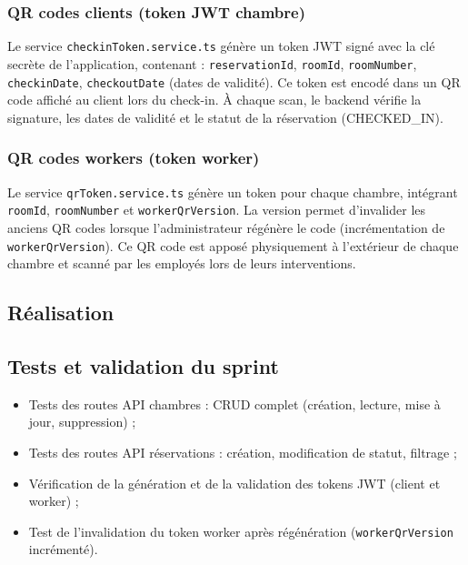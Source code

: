 \subsubsection{QR codes clients (token JWT chambre)}

Le service \texttt{checkinToken.service.ts} génère un token JWT signé avec la clé secrète de l'application, contenant : \texttt{reservationId}, \texttt{roomId}, \texttt{roomNumber}, \texttt{checkinDate}, \texttt{checkoutDate} (dates de validité). Ce token est encodé dans un QR code affiché au client lors du check-in. À chaque scan, le backend vérifie la signature, les dates de validité et le statut de la réservation (CHECKED\_IN).

\subsubsection{QR codes workers (token worker)}

Le service \texttt{qrToken.service.ts} génère un token pour chaque chambre, intégrant \texttt{roomId}, \texttt{roomNumber} et \texttt{workerQrVersion}. La version permet d'invalider les anciens QR codes lorsque l'administrateur régénère le code (incrémentation de \texttt{workerQrVersion}). Ce QR code est apposé physiquement à l'extérieur de chaque chambre et scanné par les employés lors de leurs interventions.

\subsection{Réalisation}


\subsection{Tests et validation du sprint}

\begin{itemize}
  \item Tests des routes API chambres : CRUD complet (création, lecture, mise à jour, suppression) ;
  \item Tests des routes API réservations : création, modification de statut, filtrage ;
  \item Vérification de la génération et de la validation des tokens JWT (client et worker) ;
  \item Test de l'invalidation du token worker après régénération (\texttt{workerQrVersion} incrémenté).
\end{itemize}

